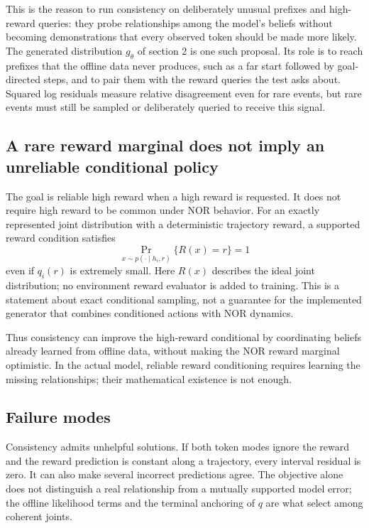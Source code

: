 \documentclass{article}
\begin{document}
This is the reason to run consistency on deliberately unusual prefixes and high-reward queries: they
probe relationships among the model's beliefs without becoming demonstrations that every observed token
should be made more likely. The generated distribution $g_\theta$ of section 2 is one such proposal. Its
role is to reach prefixes that the offline data never produces, such as a far start followed by
goal-directed steps, and to pair them with the reward queries the test asks about. Squared log residuals
measure relative disagreement even for rare events, but rare events must still be sampled or deliberately
queried to receive this signal.

\subsection*{A rare reward marginal does not imply an unreliable conditional policy}

The goal is reliable high reward when a high reward is requested. It does not require high reward to
be common under NOR behavior. For an exactly represented joint distribution with a deterministic
trajectory reward, a supported reward condition satisfies
\[
\Pr_{x\sim p(\cdot\mid h_i,r)}\{R(x)=r\}=1
\]
even if $q_i(r)$ is extremely small. Here $R(x)$ describes the ideal joint distribution; no environment
reward evaluator is added to training. This is a statement about exact conditional sampling, not a
guarantee for the implemented generator that combines conditioned actions with NOR dynamics.

Thus consistency can improve the high-reward conditional by coordinating beliefs already learned
from offline data, without making the NOR reward marginal optimistic. In the actual model, reliable
reward conditioning requires learning the missing relationships; their mathematical existence is not
enough.

\subsection*{Failure modes}

Consistency admits unhelpful solutions. If both token modes ignore the reward and the reward
prediction is constant along a trajectory, every interval residual is zero. It can also make several
incorrect predictions agree. The objective alone does not distinguish a real relationship from a mutually
supported model error; the offline likelihood terms and the terminal anchoring of $q$ are what select among
coherent joints.
\end{document}
